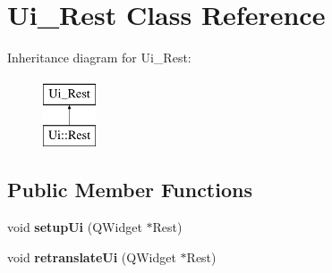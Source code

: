 \hypertarget{class_ui___rest}{}\section{Ui\+\_\+\+Rest Class Reference}
\label{class_ui___rest}
Inheritance diagram for Ui\+\_\+\+Rest\+:\begin{figure}[H]
\begin{center}
\leavevmode
\includegraphics[height=2.000000cm]{class_ui___rest}
\end{center}
\end{figure}
\subsection*{Public Member Functions}
\begin{DoxyCompactItemize}
\item 
\mbox{\label{class_ui___rest_a253b78a5039477f0b8e9db845902d6c7}} 
void {\bfseries setup\+Ui} (Q\+Widget $\ast$Rest)
\item 
\mbox{\label{class_ui___rest_aae561dfcaf613c6e96e629df113b62bd}} 
void {\bfseries retranslate\+Ui} (Q\+Widget $\ast$Rest)
\end{DoxyCompactItemize}
